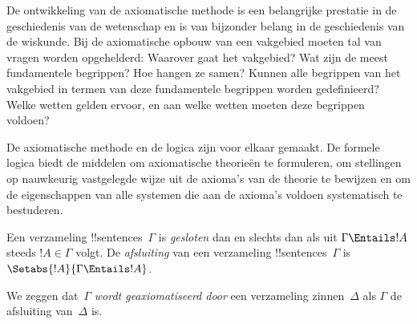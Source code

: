 \documentclass[../../../include/open-logic-section]{subfiles}
\begin{document}

\begin{explain}
De ontwikkeling van de axiomatische methode is een belangrijke
prestatie in de geschiedenis van de wetenschap en is van bijzonder
belang in de geschiedenis van de wiskunde. Bij de axiomatische opbouw
van een vakgebied moeten tal van vragen worden opgehelderd: Waarover
gaat het vakgebied? Wat zijn de meest fundamentele begrippen? Hoe
hangen ze samen? Kunnen alle begrippen van het vakgebied in termen van
deze fundamentele begrippen worden gedefinieerd? Welke wetten gelden
ervoor, en aan welke wetten moeten deze begrippen voldoen?

De axiomatische methode en de logica zijn voor elkaar gemaakt. De
formele logica biedt de middelen om axiomatische theorieën te
formuleren, om stellingen op nauwkeurig vastgelegde wijze uit de
axioma's van de theorie te bewijzen en om de eigenschappen van alle
systemen die aan de axioma's voldoen systematisch te bestuderen.
\end{explain}

\begin{defn}
Een verzameling !!{sentence}s~$\Gamma$ is \emph{gesloten} dan en
slechts dan als uit $\Gamma \Entails !A$ steeds $!A \in \Gamma$
volgt. De \emph{afsluiting} van een verzameling !!{sentence}s~$\Gamma$
is $\Setabs{!A}{\Gamma \Entails !A}$.

We zeggen dat~$\Gamma$ \emph{wordt geaxiomatiseerd door} een
verzameling zinnen~$\Delta$ als $\Gamma$ de afsluiting van~$\Delta$ is.
\end{defn}
\end{document}
